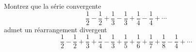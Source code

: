 
\begin{exercice}\label{exo0064}

Montrez que la série convergente
\begin{equation}
	\frac{1}{2}-\frac{1}{2}+\frac{1}{3}-\frac{1}{3}+\frac{1}{4}-\frac{1}{4}+\cdots
\end{equation}
admet un réarrangement divergent
$$\frac{1}{2}-\frac{1}{2}+\frac{1}{3}+\frac{1}{4}-\frac{1}{3}
+\frac{1}{5}+\frac{1}{6}+\frac{1}{7}+\frac{1}{8}-\frac{1}{4}+\cdots$$

\end{exercice}
